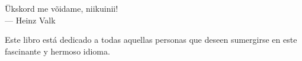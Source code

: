 
\thispagestyle{empty}


\vspace*{3cm}

\begin{center}
Ükskord me võidame, niikuinii! \\ \medskip
--- Heinz Valk
\end{center}

\medskip

\begin{center}
Este libro está dedicado a todas aquellas personas que deseen sumergirse en este fascinante y hermoso idioma.
\end{center}
